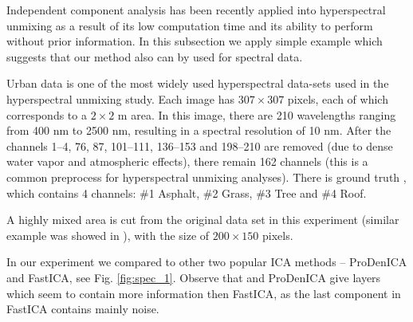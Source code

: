 Independent component analysis has been recently
applied into hyperspectral unmixing 
\cite{wang2015abundance, caiafa2008blind}
as a result of its low
computation time and its ability to perform without prior information.
In this subsection we apply simple example which suggests that our method also can by used for spectral data.

Urban data  \cite{fyzhu2014IJPRSSSNMF,fyzhu2014TIPDgSNMF,fyzhu2014JSTSPRRLbSF} is one of the most widely used hyperspectral data-sets used in the hyperspectral unmixing study. Each image has $307 \times 307$ pixels, each of which corresponds to a $2 \times 2$ m area. In this image, there are 210 wavelengths ranging from 400 nm  to 2500 nm, resulting in a spectral resolution of 10 nm. After the channels 1--4, 76, 87, 101--111, 136--153 and 198--210 are removed (due to dense water vapor and atmospheric effects), there remain 162  channels (this is a common preprocess for hyperspectral unmixing analyses). There is ground truth \cite{fyzhu2014IJPRSSSNMF,fyzhu2014TIPDgSNMF,fyzhu2014JSTSPRRLbSF}, which contains 4 channels: \#1 Asphalt, \#2 Grass, \#3 Tree and \#4 Roof.

A highly mixed area is cut from the original data set in this experiment (similar example was showed in \cite{wang2015abundance}), with the size of $200 \times 150$ pixels. %

In our experiment we compared \ICA{} to other two popular ICA methods --
ProDenICA and FastICA, see Fig. \ref{fig:spec_1}. Observe that \ICA{} and ProDenICA give layers which seem to contain more information then FastICA, as the last component in FastICA contains mainly noise.


%
%


